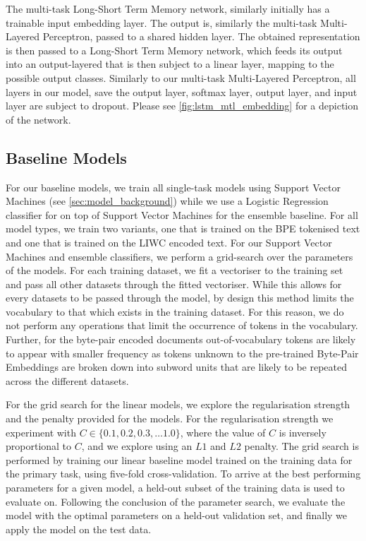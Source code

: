 The multi-task Long-Short Term Memory network, similarly initially has a trainable input embedding layer. The output is, similarly the multi-task Multi-Layered Perceptron, passed to a shared hidden layer. The obtained representation is then passed to a Long-Short Term Memory network, which feeds its output into an output-layered that is then subject to a linear layer, mapping to the possible output classes. Similarly to our multi-task Multi-Layered Perceptron, all layers in our model, save the output layer, softmax layer, output layer, and input layer are subject to dropout. Please see \autoref{fig:lstm_mtl_embedding} for a depiction of the network.

\subsection{Baseline Models}

For our baseline models, we train all single-task models using Support Vector Machines (see \autoref{sec:model_background}) while we use a Logistic Regression classifier for on top of Support Vector Machines for the ensemble baseline. For all model types, we train two variants, one that is trained on the BPE tokenised text and one that is trained on the LIWC encoded text. For our Support Vector Machines and ensemble classifiers, we perform a grid-search over the parameters of the models. For each training dataset, we fit a vectoriser to the training set and pass all other datasets through the fitted vectoriser. While this allows for every datasets to be passed through the model, by design this method limits the vocabulary to that which exists in the training dataset. For this reason, we do not perform any operations that limit the occurrence of tokens in the vocabulary. Further, for the byte-pair encoded documents out-of-vocabulary tokens are likely to appear with smaller frequency as tokens unknown to the pre-trained Byte-Pair Embeddings are broken down into subword units that are likely to be repeated across the different datasets.

For the grid search for the linear models, we explore the regularisation strength and the penalty provided for the models. For the regularisation strength we experiment with $C\in \{0.1, 0.2, 0.3, \ldots 1.0\}$, where the value of $C$ is inversely proportional to $C$, and we explore using an $L1$ and $L2$ penalty. The grid search is performed by training our linear baseline model trained on the training data for the primary task, using five-fold cross-validation. To arrive at the best performing parameters for a given model, a held-out subset of the training data is used to evaluate on. Following the conclusion of the parameter search, we evaluate the model with the optimal parameters on a held-out validation set, and finally we apply the model on the test data.

